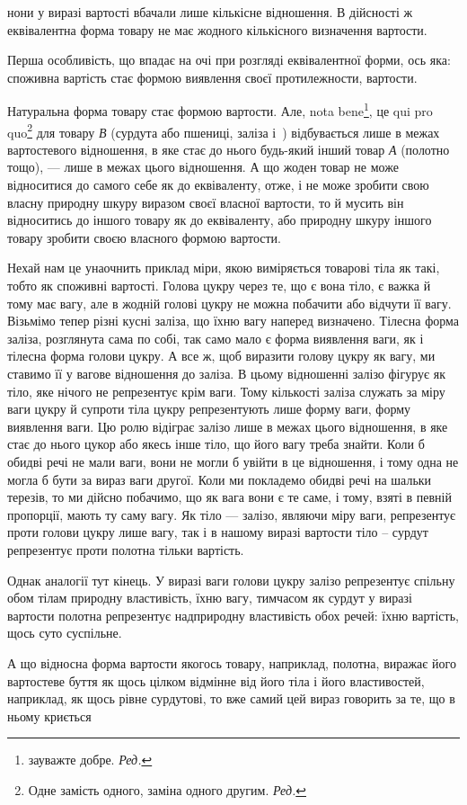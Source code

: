 \parcont{}  %
нони у виразі вартості вбачали лише кількісне відношення. В дійсності ж еквівалентна форма товару не
має жодного кількісного визначення вартости.

Перша особливість, що впадає на очі при розгляді еквівалентної форми, ось яка: споживна вартість
стає формою виявлення своєї протилежности, вартости.

Натуральна форма товару стає формою вартости. Але, nota bene\footnote*{
зауважте добре. \emph{Ред.}
}, це qui pro quo\footnote*{
Одне замість одного, заміна одного другим. \emph{Ред.}
} для товару \emph{В}
(сурдута або пшениці, заліза і~) відбувається лише в межах вартостевого відношення, в яке стає
до нього будь-який інший товар \emph{А} (полотно тощо), — лише в межах цього відношення. А що жоден товар
не може відноситися до самого себе як до еквіваленту, отже, і не може зробити свою власну природну
шкуру виразом своєї власної вартости, то й мусить він відноситись до іншого товару як до
еквіваленту, або природну шкуру іншого товару зробити своєю власного формою вартости.

Нехай нам це унаочнить приклад міри, якою виміряється товарові тіла як такі, тобто як споживні
вартості. Голова цукру через те, що є вона тіло, є важка й тому має вагу, але в жодній голові цукру
не можна побачити або відчути її вагу. Візьмімо тепер різні кусні заліза, що їхню вагу наперед
визначено. Тілесна форма заліза, розглянута сама по собі, так само мало є форма виявлення ваги, як і
тілесна форма голови цукру. А все ж, щоб виразити голову цукру як вагу, ми ставимо її у вагове
відношення до заліза. В цьому відношенні залізо фігурує як тіло, яке нічого не репрезентує крім
ваги. Тому кількості заліза служать за міру ваги цукру й супроти тіла цукру репрезентують лише форму
ваги, форму виявлення ваги. Цю ролю відіграє залізо лише в межах цього відношення, в яке стає до
нього цукор або якесь інше тіло, що його вагу треба знайти. Коли б обидві речі не мали ваги, вони не
могли б увійти в це відношення, і тому одна не могла б бути за вираз ваги другої. Коли ми покладемо
обидві речі на шальки терезів, то ми дійсно побачимо, що як вага вони є те саме, і тому, взяті в
певній пропорції, мають ту саму вагу. Як тіло — залізо, являючи міру ваги, репрезентує проти голови
цукру лише вагу, так і в нашому виразі вартости тіло – сурдут репрезентує проти полотна тільки
вартість.

Однак аналогії тут кінець. У виразі ваги голови цукру залізо репрезентує спільну обом тілам природну
властивість, їхню вагу, тимчасом як сурдут у виразі вартости полотна репрезентує надприродну
властивість обох речей: їхню вартість, щось суто суспільне.

А що відносна форма вартости якогось товару, наприклад,
полотна, виражає його вартостеве буття як щось цілком відмінне від його тіла і його властивостей,
наприклад, як щось рівне сурдутові, то вже самий цей вираз говорить за те, що в ньому криється
\parbreak{}  %
